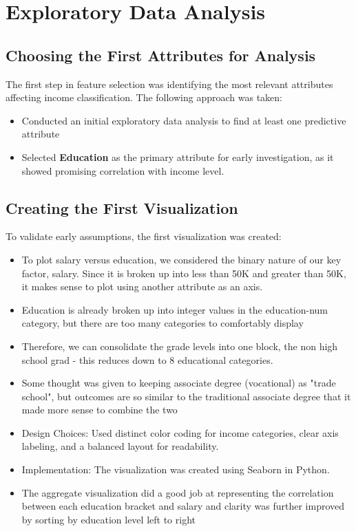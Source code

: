\documentclass[journal,onecolumn]{IEEEtran}
\begin{document}
\section{Exploratory Data Analysis}

\subsection{Choosing the First Attributes for Analysis}
The first step in feature selection was identifying the most relevant attributes affecting income classification. The following approach was taken:
\begin{itemize}
    \item Conducted an initial exploratory data analysis to find at least one predictive attribute
    \item Selected \textbf{Education} as the primary attribute for early investigation, as it showed promising correlation with income level.
\end{itemize}

\subsection{Creating the First Visualization}
To validate early assumptions, the first visualization was created:
\begin{itemize}
    \item To plot salary versus education, we considered the binary nature of our key factor, salary. Since it is broken up into less than 50K and greater than 50K, it makes sense to plot using another attribute as an axis.
    \item Education is already broken up into integer values in the education-num category, but there are too many categories to comfortably display
    \item Therefore, we can consolidate the grade levels into one block, the non high school grad - this reduces down to 8 educational categories.
    \item Some thought was given to keeping associate degree (vocational) as "trade school", but outcomes are so similar to the traditional associate degree that it made more sense to combine the two
    \item Design Choices: Used distinct color coding for income categories, clear axis labeling, and a balanced layout for readability.
    \item Implementation: The visualization was created using Seaborn in Python.
    \item The aggregate visualization did a good job at representing the correlation between each education bracket and salary and clarity was further improved by sorting by education level left to right
\end{itemize}
\end{document}
